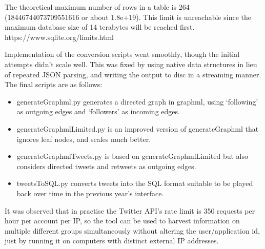 The theoretical maximum number of rows in a table is 264 (18446744073709551616 or about 1.8e+19). This limit is unreachable since the maximum database size of 14 terabytes will be reached first.
https://www.sqlite.org/limits.html

Implementation of the conversion scripts went smoothly, though the initial attempts didn't scale well. This was fixed by using native data structures in lieu of repeated JSON parsing, and writing the output to disc in a streaming manner. The final scripts are as follows:
\begin{itemize}
\item generateGraphml.py generates a directed graph in graphml, using ‘following' as outgoing edges and ‘followers' as incoming edges.
\item generateGraphmlLimited.py is an improved version of generateGraphml that ignores leaf nodes, and scales much better.
\item generateGraphmlTweets.py is based on generateGraphmlLimited but also considers directed tweets and retweets as outgoing edges.
\item tweetsToSQL.py converts tweets into the SQL format suitable to be played back over time in the previous year's interface.
\end{itemize}

It was observed that in practise the Twitter API's rate limit is 350 requests per hour per account per IP, so the tool can be used to harvest information on multiple different groups simultaneously without altering the user/application id, just by running it on computers with distinct external IP addresses.